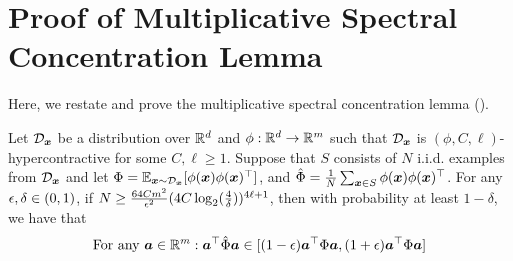 
\appendix

\section{Proof of Multiplicative Spectral Concentration Lemma}\label{appendix:tds-kernels}

Here, we restate and prove the multiplicative spectral concentration lemma ().

\begin{lemma}\label{lemma:appendix-relative-error-kernel-matrix}
    Let ${\mathcal{D}}_{{\bm{x}}}$ be a distribution over $\mathbb{R}^d$ and $\phi:\mathbb{R}^d \to \mathbb{R}^m$ such that ${\mathcal{D}}_{{\bm{x}}}$ is $(\phi,C,\ell)$-hypercontractive for some $C,\ell \ge 1$. Suppose that $S$ consists of $N$ i.i.d. examples from ${\mathcal{D}}_{{\bm{x}}}$ and let $\Phi = \mathbb{E}_{{\bm{x}}\sim{\mathcal{D}}_{{\bm{x}}}}[\phi({\bm{x}})\phi({\bm{x}})^\top]$, and $\hat\Phi = \frac{1}{N}\sum_{{\bm{x}}\in S}\phi({\bm{x}})\phi({\bm{x}})^\top$. For any ${\epsilon},\delta\in(0,1)$, if $N\ge \frac{64 Cm^2}{{\epsilon}^2}(4C \log_2(\frac{4}{\delta}))^{4\ell+1}$, then with probability at least $1-\delta$, we have that
    \[
        \text{For any }{\bm{a}}\in\mathbb{R}^m: {\bm{a}}^\top \hat\Phi {\bm{a}} \in [{(1-{\epsilon})} {\bm{a}}^\top \Phi{\bm{a}}, (1+{\epsilon}){\bm{a}}^\top \Phi{\bm{a}}]
    \]
\end{lemma}

